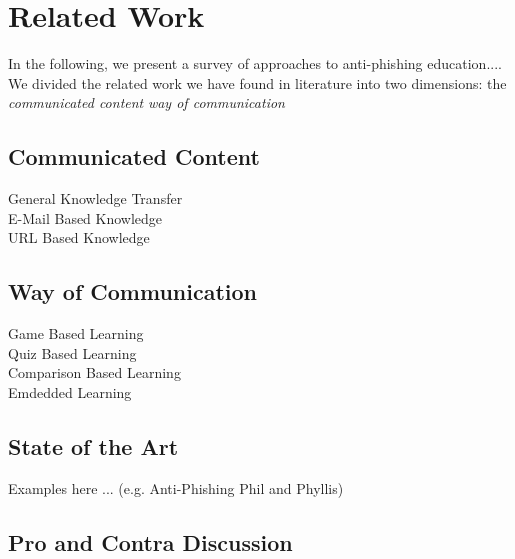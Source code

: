 
\section{Related Work}
\label{s:related_work}

In the following, we present a survey of approaches to anti-phishing education....
We divided the related work we have found in literature into two dimensions: the \textit{communicated content} 
\textit{way of communication} 

\subsection{Communicated Content}

\begin{description}
	\item[General Knowledge Transfer]
	\item[E-Mail Based Knowledge]
	\item[URL Based Knowledge]
\end{description}

\subsection{Way of Communication}
\begin{description}
	\item[Game Based Learning]
	\item[Quiz Based Learning]
	\item[Comparison Based Learning]
	\item[Emdedded Learning]
\end{description}

\subsection{State of the Art}
Examples here ... (e.g. Anti-Phishing Phil and Phyllis)
\subsection{Pro and Contra Discussion}
\label{related_work:discussion}
